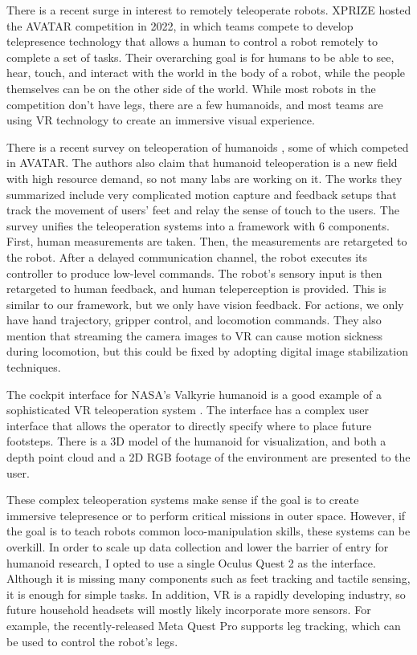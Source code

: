 There is a recent surge in interest to remotely teleoperate robots. 
XPRIZE hosted the AVATAR competition in 2022, in which teams compete to develop telepresence technology that allows a human to control a robot remotely to complete a set of tasks. 
Their overarching goal is for humans to be able to see, hear, touch, and interact with the world in the body of a robot, while the people themselves can be on the other side of the world.
While most robots in the competition don't have legs, there are a few humanoids, and most teams are using VR technology to create an immersive visual experience.

There is a recent survey on teleoperation of humanoids \cite{darvish2023teleoperation},  some of which competed in AVATAR. The authors also claim that humanoid teleoperation is a new field with high resource demand, so not many labs are working on it. The works they summarized include very complicated motion capture and feedback setups that track the movement of users' feet and relay the sense of touch to the users. The survey unifies the teleoperation systems into a framework with 6 components. First, human measurements are taken. Then, the measurements are retargeted to the robot. After a delayed communication channel, the robot executes its controller to produce low-level commands. The robot's sensory input is then retargeted to human feedback, and human teleperception is provided.
This is similar to our framework, but we only have vision feedback. For actions, we only have hand trajectory, gripper control, and locomotion commands. They also mention that streaming the camera images to VR can cause motion sickness during locomotion, but this could be fixed by adopting digital image stabilization techniques.

The cockpit interface for NASA's Valkyrie humanoid is a good example of a sophisticated VR teleoperation system \cite{nasa}. The interface has a complex user interface that allows the operator to directly specify where to place future footsteps. There is a 3D model of the humanoid for visualization, and both a depth point cloud and a 2D RGB footage of the environment are presented to the user. 

These complex teleoperation systems make sense if the goal is to create immersive telepresence or to perform critical missions in outer space. However, if the goal is to teach robots common loco-manipulation skills, these systems can be overkill. In order to scale up data collection and lower the barrier of entry for humanoid research, I opted to use a single Oculus Quest 2 as the interface. Although it is missing many components such as feet tracking and tactile sensing, it is enough for simple tasks. In addition, VR is a rapidly developing industry, so future household headsets will mostly likely incorporate more sensors. For example, the recently-released Meta Quest Pro supports leg tracking, which can be used to control the robot's legs.
